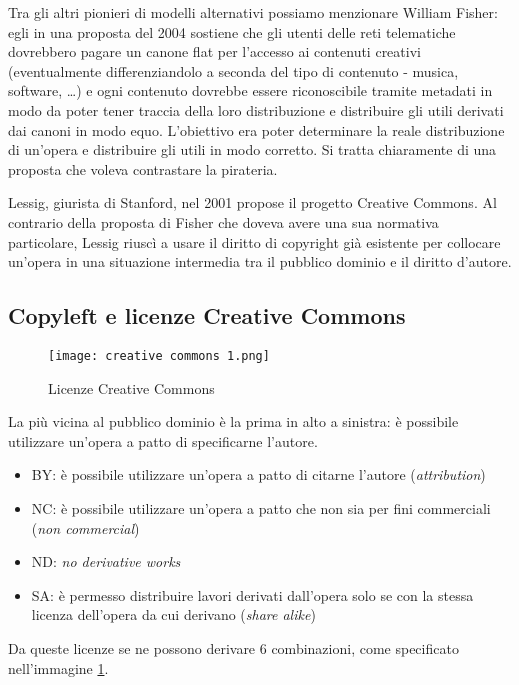 Tra gli altri pionieri di modelli alternativi possiamo menzionare William Fisher: egli in una proposta del 2004 sostiene che gli utenti delle reti telematiche dovrebbero pagare un canone flat per l'accesso ai contenuti creativi (eventualmente differenziandolo a seconda del tipo di contenuto - musica, software, …) e ogni contenuto dovrebbe essere riconoscibile tramite metadati in modo da poter tener traccia della loro distribuzione e distribuire gli utili derivati dai canoni in modo equo. L'obiettivo era poter determinare la reale distribuzione di un'opera e distribuire gli utili in modo corretto. Si tratta chiaramente di una proposta che voleva contrastare la pirateria. 

Lessig, giurista di Stanford, nel 2001 propose il progetto Creative Commons. Al contrario della proposta di Fisher che doveva avere una sua normativa particolare, Lessig riuscì a usare il diritto di copyright già esistente per collocare un'opera in una situazione intermedia tra il pubblico dominio e il diritto d'autore.

\subsection{Copyleft e licenze Creative Commons}

\begin{figure}
    \centering
    \texttt{[image: creative commons 1.png]}
    \caption{Licenze Creative Commons}
    \label{creativeCommons1}
\end{figure}

La più vicina al pubblico dominio è la prima in alto a sinistra: è possibile utilizzare un'opera a patto di specificarne l'autore.
\begin{itemize}
    \item BY: è possibile utilizzare un'opera a patto di citarne l'autore (\textit{attribution})
    \item NC: è possibile utilizzare un'opera a patto che non sia per fini commerciali (\textit{non commercial})
    \item ND: \textit{no derivative works}
    \item SA: è permesso distribuire lavori derivati dall'opera solo se con la stessa licenza dell'opera da cui derivano (\textit{share alike})
\end{itemize}

Da queste licenze se ne possono derivare 6 combinazioni, come specificato nell'immagine \ref{creativeCommons1}. 


